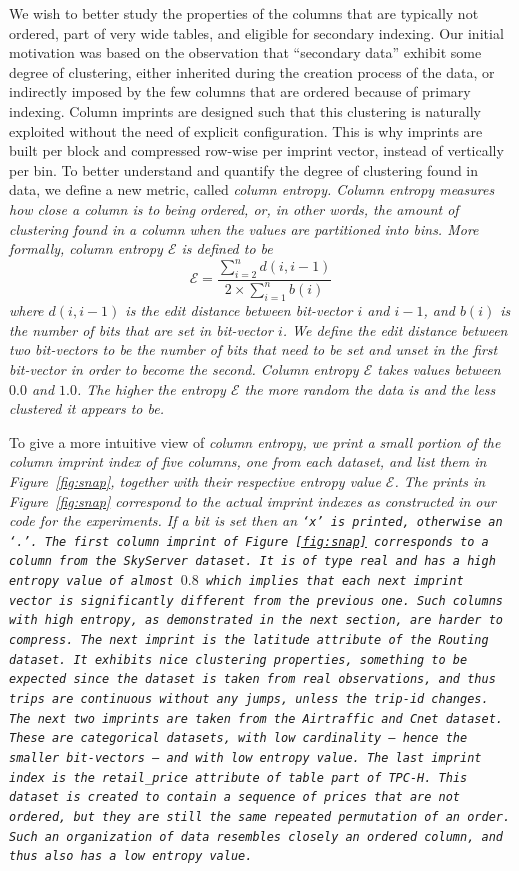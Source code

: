 We wish to better study the properties of the columns that are typically not
ordered, part of very wide tables, and eligible for secondary indexing. Our
initial motivation was based on the observation that ``secondary data'' exhibit
some degree of clustering, either inherited during the creation process of the
data, or indirectly imposed by the few columns that are ordered because of
primary indexing. Column imprints are designed such that this clustering is
naturally exploited without the need of explicit configuration. This is why
imprints are built per block and compressed row-wise per imprint vector,
instead of vertically per bin.
To better understand and quantify the degree of clustering found in data, we
define a new metric, called \it{column entropy}. Column entropy measures how close
a column is to being ordered, or, in other words, the amount of clustering found
in a column when the values are partitioned into bins. More formally, column
entropy $\mathcal{E}$ is defined to be
$$\mathcal{E}=\frac{\sum^{n}_{i=2}d(i,i-1)}{2\times\sum^{n}_{i=1}b(i)}$$
where $d(i,i-1)$ is the \it{edit distance} between bit-vector $i$ and $i-1$,
and $b(i)$ is the number of bits that are set in bit-vector $i$. We define the
edit distance between two bit-vectors to be the number of bits that need to be
set and unset in the first bit-vector in order to become the second. Column
entropy $\mathcal{E}$ takes values between $0.0$ and $1.0$. The higher the
entropy $\mathcal{E}$ the more random the data is and the less clustered it
appears to be.

To give a more intuitive view of \it{column entropy}, we print a
small portion of the column imprint index of five columns, one from each
dataset, and list them in Figure~\ref{fig:snap}, together with their respective
entropy value $\mathcal{E}$. The prints in Figure~\ref{fig:snap} correspond to
the actual imprint indexes as constructed in our code for the experiments. If a
bit is set then an \tt{`x'} is printed, otherwise an \tt{`.'}. The first
column imprint of Figure~\ref{fig:snap} corresponds to a column from the
SkyServer dataset. It is of type real and has a high entropy value of almost
$0.8$ which implies that each next imprint vector is significantly different
from the previous one. Such columns with high entropy, as demonstrated in the
next section, are harder to compress. The next imprint is the latitude
attribute of the Routing dataset. It exhibits nice clustering properties,
something to be expected since the dataset is taken from real observations, and
thus trips are continuous without any jumps, unless the trip-id changes. The
next two imprints are taken from the Airtraffic and Cnet dataset. These are
categorical datasets, with low cardinality -- hence the smaller bit-vectors --
and with low entropy value. The last imprint index is the \it{retail\_price}
attribute of table \it{part} of TPC-H. This dataset is created to contain a
sequence of prices that are not ordered, but they are still the same repeated
permutation of an order. Such an organization of data resembles closely an
ordered column, and thus also has a low entropy value.

